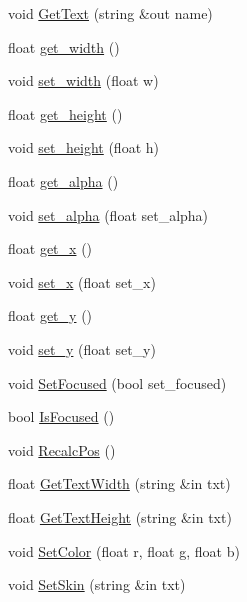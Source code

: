\begin{DoxyCompactItemize}
\item 
void \hyperlink{class_g_u_i_pager_ad064d25033f28c7dcca09c1e0e8123bd}{Get\+Text} (string \&out name)
\item 
float \hyperlink{class_g_u_i_pager_a09a2d9e575563a4828067ab5f060a5f8}{get\+\_\+width} ()
\item 
void \hyperlink{class_g_u_i_pager_a2e479060a39997aaf4ce49f21d1d1e25}{set\+\_\+width} (float w)
\item 
float \hyperlink{class_g_u_i_pager_ab10f1d7e35fa9454660cb14ecb28b235}{get\+\_\+height} ()
\item 
void \hyperlink{class_g_u_i_pager_a3ff7d05c94251636e192838e11cddd36}{set\+\_\+height} (float h)
\item 
float \hyperlink{class_g_u_i_pager_afb573705e3d178d0aad836df382bc01d}{get\+\_\+alpha} ()
\item 
void \hyperlink{class_g_u_i_pager_a9b9f85507600c1ef1bae096bad947dea}{set\+\_\+alpha} (float set\+\_\+alpha)
\item 
float \hyperlink{class_g_u_i_pager_a805840981c8fb26bb137e13b8810eb37}{get\+\_\+x} ()
\item 
void \hyperlink{class_g_u_i_pager_ac7a79b1fd1f592faf00d92c0499d22b1}{set\+\_\+x} (float set\+\_\+x)
\item 
float \hyperlink{class_g_u_i_pager_a4043a46e4903a50a80e0065894c5e543}{get\+\_\+y} ()
\item 
void \hyperlink{class_g_u_i_pager_aab208d26c67d965874dd68d9fb5ab5ff}{set\+\_\+y} (float set\+\_\+y)
\item 
void \hyperlink{class_g_u_i_pager_ad3868d8176faa9682b6a0ed27e63bdfe}{Set\+Focused} (bool set\+\_\+focused)
\item 
bool \hyperlink{class_g_u_i_pager_a013bffb553bec18947ce45b8ff63417a}{Is\+Focused} ()
\item 
void \hyperlink{class_g_u_i_pager_ae79f7e2081875e4a27c8993875c4094a}{Recalc\+Pos} ()
\item 
float \hyperlink{class_g_u_i_pager_a34ae16f1d28e24a68d939410d477f441}{Get\+Text\+Width} (string \&in txt)
\item 
float \hyperlink{class_g_u_i_pager_ae0658a6a8f63a60c8c0668d95d86dda2}{Get\+Text\+Height} (string \&in txt)
\item 
void \hyperlink{class_g_u_i_pager_a0cf8dbdac2c1411eb1b61dfbfb6a672b}{Set\+Color} (float r, float g, float b)
\item 
void \hyperlink{class_g_u_i_pager_a479a0138f1c453e34f05ba7b3dca428a}{Set\+Skin} (string \&in txt)
\item 

\end{DoxyCompactItemize}
